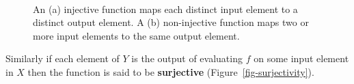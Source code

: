 \documentclass[
  letterpaper,
  DIV=11,
  numbers=noendperiod]{scrartcl}
\begin{document}
\begin{figure}
\begin{minipage}[t]{0.90\linewidth}
{{}

}

\subcaption{\label{fig-non-injective}}
\end{minipage}%
%
\begin{minipage}[t]{0.05\linewidth}

{\centering 

~

}

\end{minipage}%

\caption{\label{fig-injectivity}An (a) injective function maps each
distinct input element to a distinct output element. A (b) non-injective
function maps two or more input elements to the same output element.}

\end{figure}

Similarly if each element of \(Y\) is the output of evaluating \(f\) on
some input element in \(X\) then the function is said to be
\textbf{surjective} (Figure~\ref{fig-surjectivity}).
\end{document}
